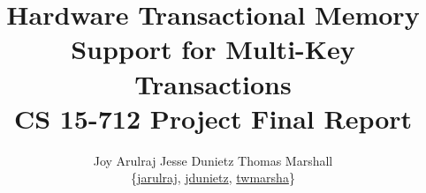 \documentclass[pageno]{jpaper}
\makeatletter
\newcommand{\email}[1]{\href{mailto:#1@cs.cmu.edu}{#1}}
\makeatother
\begin{document}
\title{Hardware Transactional Memory Support for Multi-Key Transactions\\
\large{CS 15-712 Project Final Report}}

\author{Joy Arulraj \hspace{0.1 in} Jesse Dunietz \hspace{0.1 in} Thomas Marshall\\ 
{\{\email{jarulraj}, \email{jdunietz}, \email{twmarsha}\}}}

\date{}
\maketitle









\end{document}
